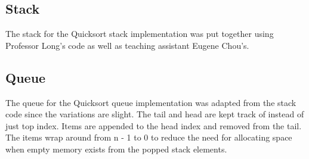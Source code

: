 \documentclass[12pt]{article}
\begin{document}
	\subsection{Stack}

	The stack for the Quicksort stack implementation was put together using Professor Long's code as well as teaching assistant Eugene Chou's.

	\subsection{Queue}

	The queue for the Quicksort queue implementation was adapted from the stack code since the variations are slight.
	The tail and head are kept track of instead of just top index.
	Items are appended to the head index and removed from the tail.
	The items wrap around from n - 1 to 0 to reduce the need for allocating space when empty memory exists from the popped stack elements.
\end{document}
